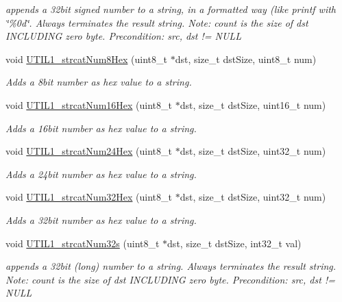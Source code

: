 \begin{DoxyCompactItemize}
\begin{DoxyCompactList}\small\item\em appends a 32bit signed number to a string, in a formatted way (like printf with \char`\"{}\%0d\char`\"{}. Always terminates the result string. Note\+: count is the size of dst I\+N\+C\+L\+U\+D\+I\+NG zero byte. Precondition\+: src, dst != N\+U\+LL \end{DoxyCompactList}\item 
void \hyperlink{group___u_t_i_l1__module_ga4b505e94761b330fa24903d12f0a8508}{U\+T\+I\+L1\+\_\+strcat\+Num8\+Hex} (uint8\+\_\+t $\ast$dst, size\+\_\+t dst\+Size, uint8\+\_\+t num)
\begin{DoxyCompactList}\small\item\em Adds a 8bit number as hex value to a string. \end{DoxyCompactList}\item 
void \hyperlink{group___u_t_i_l1__module_ga8b8594202e97c9e5824ce6a9e3fb29b8}{U\+T\+I\+L1\+\_\+strcat\+Num16\+Hex} (uint8\+\_\+t $\ast$dst, size\+\_\+t dst\+Size, uint16\+\_\+t num)
\begin{DoxyCompactList}\small\item\em Adds a 16bit number as hex value to a string. \end{DoxyCompactList}\item 
void \hyperlink{group___u_t_i_l1__module_ga02a8cd396c6d3d9234321d63a0dceece}{U\+T\+I\+L1\+\_\+strcat\+Num24\+Hex} (uint8\+\_\+t $\ast$dst, size\+\_\+t dst\+Size, uint32\+\_\+t num)
\begin{DoxyCompactList}\small\item\em Adds a 24bit number as hex value to a string. \end{DoxyCompactList}\item 
void \hyperlink{group___u_t_i_l1__module_ga6b2f6bc66460e5f81ab2d934d99b0221}{U\+T\+I\+L1\+\_\+strcat\+Num32\+Hex} (uint8\+\_\+t $\ast$dst, size\+\_\+t dst\+Size, uint32\+\_\+t num)
\begin{DoxyCompactList}\small\item\em Adds a 32bit number as hex value to a string. \end{DoxyCompactList}\item 
void \hyperlink{group___u_t_i_l1__module_ga0b51bb7363954ff1122274315e4a05fc}{U\+T\+I\+L1\+\_\+strcat\+Num32s} (uint8\+\_\+t $\ast$dst, size\+\_\+t dst\+Size, int32\+\_\+t val)
\begin{DoxyCompactList}\small\item\em appends a 32bit (long) number to a string. Always terminates the result string. Note\+: count is the size of dst I\+N\+C\+L\+U\+D\+I\+NG zero byte. Precondition\+: src, dst != N\+U\+LL \end{DoxyCompactList}\item 

\end{DoxyCompactItemize}
